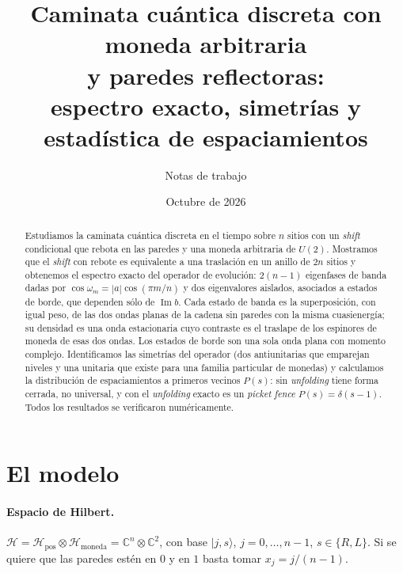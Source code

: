 \documentclass[11pt,a4paper]{article}
\title{Caminata cuántica discreta con moneda arbitraria\\ y paredes reflectoras:\\ espectro exacto, simetrías y estadística de espaciamientos}
\author{Notas de trabajo}
\date{Octubre de 2026}
\theoremstyle{remark}
\newcommand{\ket}[1]{\lvert #1\rangle}
\newcommand{\im}{\operatorname{Im}}
\begin{document}
\maketitle

\begin{abstract}
Estudiamos la caminata cuántica discreta en el tiempo sobre $n$ sitios con un
\emph{shift} condicional que rebota en las paredes y una moneda arbitraria de
$U(2)$. Mostramos que el \emph{shift} con rebote es equivalente a una traslación
en un anillo de $2n$ sitios y obtenemos el espectro exacto del operador de
evolución: $2(n-1)$ eigenfases de banda dadas por
$\cos\omega_m=|a|\cos(\pi m/n)$ y dos eigenvalores aislados, asociados a
estados de borde, que dependen sólo de $\im b$. Cada estado de banda es la
superposición, con igual peso, de las dos ondas planas de la cadena sin
paredes con la misma cuasienergía; su densidad es una onda estacionaria cuyo
contraste es el traslape de los espinores de moneda de esas dos ondas. Los
estados de borde son una sola onda plana con momento complejo. Identificamos las simetrías del
operador (dos antiunitarias que emparejan niveles y una unitaria que existe
para una familia particular de monedas) y calculamos la distribución de
espaciamientos a primeros vecinos $P(s)$: sin \emph{unfolding} tiene forma
cerrada, no universal, y con el \emph{unfolding} exacto es un
\emph{picket fence} $P(s)=\delta(s-1)$. Todos los resultados se verificaron
numéricamente.
\end{abstract}

\noindent{}

\section{El modelo}

\paragraph{Espacio de Hilbert.}
$\mathcal H=\mathcal H_{\text{pos}}\otimes\mathcal H_{\text{moneda}}=\mathbb C^n\otimes\mathbb C^2$, con base
$\ket{j,s}$, $j=0,\dots,n-1$, $s\in\{R,L\}$. Si se quiere que las paredes estén en
$0$ y en $1$ basta tomar $x_j=j/(n-1)$.
\end{document}
